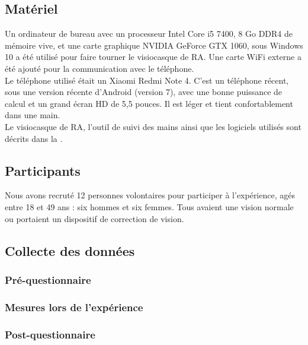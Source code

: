 \subsection{Matériel}
Un ordinateur de bureau avec un processeur Intel Core i5 7400, 8 Go DDR4 de mémoire vive, et une carte graphique NVIDIA GeForce GTX 1060, sous Windows 10 a été utilisé pour faire tourner le visiocasque de RA. Une carte WiFi externe a été ajouté pour la communication avec le téléphone.\\
Le téléphone utilisé était un Xiaomi Redmi Note 4. C'est un téléphone récent, sous une version récente d'Android (version 7), avec une bonne puissance de calcul et un grand écran HD de 5,5 pouces. Il est léger et tient confortablement dans une main.\\
Le visiocasque de RA, l'outil de suivi des mains ainsi que les logiciels utilisés sont décrits dans la .

\subsection{Participants}
Nous avons recruté 12 personnes volontaires pour participer à l'expérience, agés entre 18 et 49 ans : six hommes et six femmes. Tous avaient une vision normale ou portaient un dispositif de correction de vision.

\subsection{Collecte des données}
\subsubsection{Pré-questionnaire}

\subsubsection{Mesures lors de l'expérience}

\subsubsection{Post-questionnaire}

